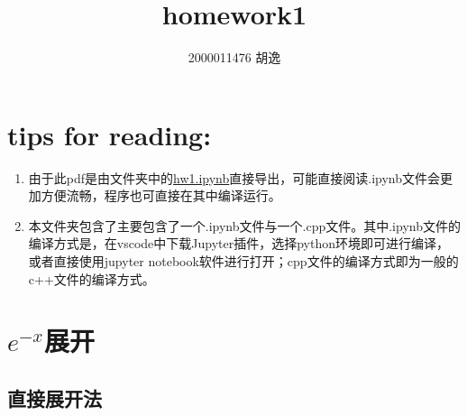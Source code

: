 \documentclass[11pt]{article}
\title{homework1}
\author{2000011476 胡逸}
\begin{document}
    
    \maketitle
    
    

    \section*{tips for reading:}
    \begin{enumerate}
    	\item
    	由于此pdf是由文件夹中的\url{hw1.ipynb}直接导出，可能直接阅读.ipynb文件会更加方便流畅，程序也可直接在其中编译运行。
    	\item
    	本文件夹包含了主要包含了一个.ipynb文件与一个.cpp文件。其中.ipynb文件的编译方式是，在vscode中下载Jupyter插件，选择python环境即可进行编译，或者直接使用jupyter notebook软件进行打开；cpp文件的编译方式即为一般的c++文件的编译方式。
    \end{enumerate}
    \section{$e^{-x}$展开}

    \subsection{直接展开法}
\end{document}
